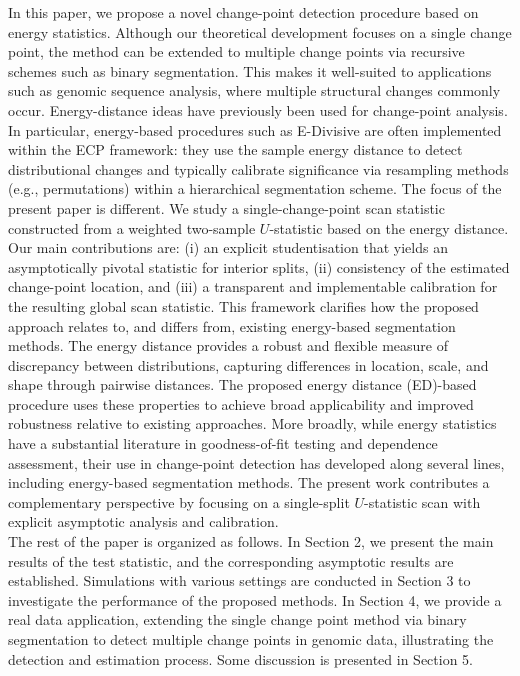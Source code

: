 \documentclass[11pt]{article}
\numberwithin{theorem}{section}
\numberwithin{Lemma}{section}
\numberwithin{Definition}{section}
\begin{document}
In this paper, we propose a novel change-point detection procedure based on energy statistics. Although our theoretical development focuses on a single change point, the method can be extended to multiple change points via recursive schemes such as binary segmentation. This makes it well-suited to applications such as genomic sequence analysis, where multiple structural changes commonly occur. Energy-distance ideas have previously been used for change-point analysis. In particular, energy-based procedures such as E-Divisive \cite{matteson2014ecp} are often implemented within the ECP framework: they use the sample energy distance to detect distributional changes and typically calibrate significance via resampling methods (e.g., permutations) within a hierarchical segmentation scheme. The focus of the present paper is different. We study a single-change-point scan statistic constructed from a weighted two-sample $U$-statistic based on the energy distance. Our main contributions are: (i) an explicit studentisation that yields an asymptotically pivotal statistic for interior splits, (ii) consistency of the estimated change-point location, and (iii) a transparent and implementable calibration for the resulting global scan statistic. This framework clarifies how the proposed approach relates to, and differs from, existing energy-based segmentation methods. 
The energy distance provides a robust and flexible measure of discrepancy between distributions, capturing differences in location, scale, and shape through pairwise distances. The proposed energy distance (ED)-based procedure uses these properties to achieve broad applicability and improved robustness relative to existing approaches. More broadly, while energy statistics have a substantial literature in goodness-of-fit testing and dependence assessment, their use in change-point detection has developed along several lines, including energy-based segmentation methods. The present work contributes a complementary perspective by focusing on a single-split $U$-statistic scan with explicit asymptotic analysis and calibration.\\



The rest of the paper is organized as follows. In Section 2, we present the main results of the test statistic, and the corresponding asymptotic results are established. Simulations with various settings are conducted in Section 3 to investigate the performance of the proposed methods. In Section 4, we provide a real data application, extending the single change point method via binary segmentation to detect multiple change points in genomic data, illustrating the detection and estimation process.  Some discussion is presented in Section 5.
\end{document}
